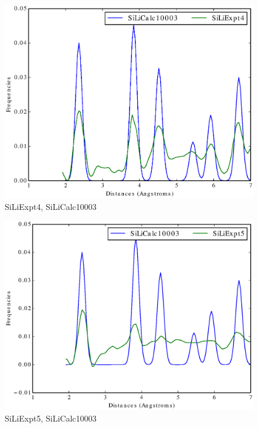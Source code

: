 \documentclass[12pt,letterpaper]{article}
\begin{document}
\begin{figure}[ht]
  \begin{center}
    \includegraphics[scale=0.8]{figs/SparseRepSiLiExpt4-SiLiCalc10003.eps}
    \caption{SiLiExpt4, SiLiCalc10003}
  \end{center}
\end{figure}

\begin{figure}[ht]
  \begin{center}
    \includegraphics[scale=0.8]{figs/SparseRepSiLiExpt5-SiLiCalc10003.eps}
    \caption{SiLiExpt5, SiLiCalc10003}
  \end{center}
\end{figure}
\end{document}
